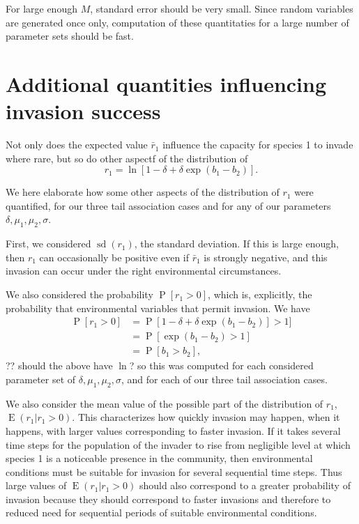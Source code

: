 \documentclass[letterpaper,11pt]{article}
\DeclareMathOperator{\EX}{E}%
\DeclareMathOperator{\sd}{sd}
\DeclareMathOperator{\Prob}{P}
\begin{document}
\noindent For large enough $M$, standard error should be very small. Since random variables are generated once only, computation of these quantitaties for a large number of parameter sets should be fast. 


\section{Additional quantities influencing invasion success} \label{sect:addquant}

Not only does the expected value $\bar r_1$ influence the capacity for species 1 to invade where rare, but so do other aspectf of the distribution of
\begin{equation}
r_1 = \ln[1-\delta+\delta \exp(b_1-b_2)]. \label{r1_distribution}
\end{equation}

We here elaborate how some other aspects of the distribution of $r_1$ were quantified, for our three tail association cases and for any of our parameters $\delta, \mu_1, \mu_2, \sigma$. 

First, we considered $\sd(r_1)$, the standard deviation. If this is large enough, then $r_1$ can occasionally be positive even if $\bar r_1$ is strongly negative, and this invasion can occur under the right environmental circumstances.

We also considered the probability $\Prob[r_1 >0]$, which is, explicitly, the probability that environmental variables that permit invasion. We have
\begin{align}
\Prob[r_1>0] &= \Prob [1-\delta+\delta \exp(b_1-b_2)] > 1] \\
&= \Prob[\exp (b_1-b_2)>1] \\
&= \Prob[b_1>b_2],
\end{align}
?? should the above have $\ln$?
\noindent so this was computed for each considered parameter set of $\delta, \mu_1, \mu_2, \sigma$, and for each of our three tail association cases. 

We also consider the mean value of the possible part of the distribution of $r_1$, $\EX(r_1|r_1>0)$. This characterizes how quickly invasion may happen, when it happens, with larger values corresponding to faster invasion. If it takes several time steps for the population of the invader to rise from negligible level at which species 1 is a noticeable presence in the community, then environmental conditions must be suitable for invasion for several sequential time steps. Thus large values of $\EX(r_1|r_1>0)$ should also correspond to a greater probability of invasion because they should correspond to faster invasions and therefore to reduced need for sequential periods of suitable environmental conditions. 
\end{document}
